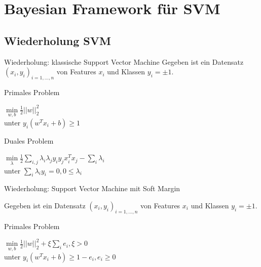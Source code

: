 \documentclass{beamer}
\begin{document}
{\section{Bayesian Framework für SVM}

\frame{\tableofcontents[currentsection,subsectionstyle=show/shaded,hideothersubsections]}

\subsection{Wiederholung SVM}

\begin{frame}{Wiederholung: klassische Support Vector Machine}
Gegeben ist ein Datensatz $(x_i,y_i)_{i=1,...,n}$ von Features $x_i$ und Klassen $y_i = \pm 1$.


\pause
\begin{block}{Primales Problem}
	\begin{center}
	$ \underset{w, b}{\min} \frac{1}{2}\vert \vert w \vert \vert ^2_2$\\
	unter $ y_i(w^T x_i + b) \geq 1$
	\end{center}
\end{block}

\pause
\begin{block}{Duales Problem}
	\begin{center}
	$\underset{\lambda}{\min} \frac{1}{2}\underset{i,j}{\sum} \lambda_i \lambda_j y_i y_j x_i^T x_j - \underset{i}{\sum}\lambda_i$ \\
	unter $\underset{i}{\sum}\lambda_i y_i = 0, 0 \leq \lambda_i $
	\end{center}
\end{block}

\end{frame}

\begin{frame}{Wiederholung: Support Vector Machine mit Soft Margin}

Gegeben ist ein Datensatz $(x_i,y_i)_{i=1,...,n}$ von Features $x_i$ und Klassen $y_i = \pm 1$.

\pause
\begin{block}{Primales Problem}
	\begin{center}
	$ \underset{w, b}{\min} \frac{1}{2}\vert \vert w \vert \vert ^2_2 + \xi \underset{i}{\sum}e_i, \xi > 0$\\
	unter $ y_i(w^T x_i + b) \geq 1 - e_i, e_i \geq 0$
	\end{center}
\end{block}


\end{frame}}
\end{document}
